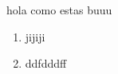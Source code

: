 \documentclass[12pt]{article}
\begin{document}
hola como estas buuu
\begin{enumerate}
    \item jijiji
    \item ddfdddff
    
\end{enumerate}
\end{document}
